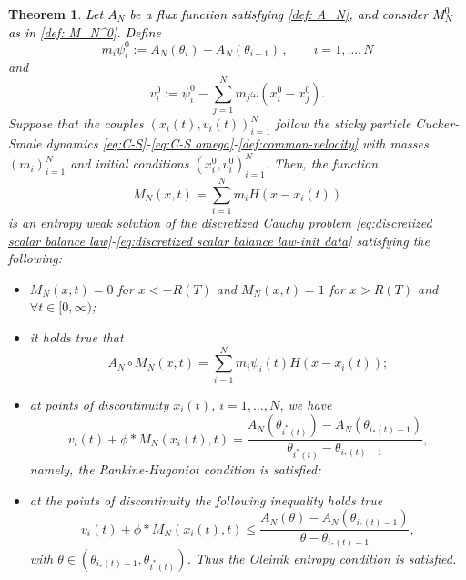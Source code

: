 \documentclass[11pt,a4paper,oneside]{amsart}
\newtheorem{theorem}[definition]{Theorem}
\begin{document}
\begin{theorem}\label{th:solution_MN}
\textcolor{black}{Let $A_N$ be a flux function satisfying \eqref{def: A_N}, and consider $M_N^0$ as in \eqref{def: M_N^0}. %
Define}
\begin{equation}\label{eq: psi_i^0}
    m_i\psi_i^0:=A_N(\theta_i)-A_N(\theta_{i-1})\,,\qquad i=1,\dots,N
\end{equation}
and
\begin{equation}
    v_i^0:=\psi_i^0-\sum_{j=1}^N m_j\omega(x_i^0-x_j^0).
\end{equation}
Suppose that the couples $(x_i(t),v_i(t))_{i=1}^N$ follow the sticky particle Cucker-Smale dynamics 
\eqref{eq:C-S}-\eqref{eq:C-S omega}-\eqref{def:common-velocity} with masses $(m_i)_{i=1}^N$ and initial conditions $(x_i^0,v_i^0)_{i=1}^N$. 
Then, the function
\begin{equation}\label{def: M_N solution}
    M_N(x,t)=\sum_{i=1}^Nm_iH(x-x_i(t))
\end{equation}
is an entropy weak solution of the discretized Cauchy problem \eqref{eq:discretized scalar balance law}-\eqref{eq:discretized scalar balance law-init data} 
satisfying the following:
\begin{itemize}
    \item[\textbf{(a)}] $M_N(x,t)=0$ for $x<-R(T)$ and $M_N(x,t)=1$ for $x>R(T)$ and $\forall t\in [0,\infty)$;
    \item[\textbf{(b)}] it holds true that
\begin{equation}\label{eq: A_N(M_N)}
    A_N\circ M_N(x,t)=\sum_{i=1}^Nm_i\psi_i(t)H(x-x_i(t));
\end{equation}
\item[\textbf{(c)}] at points of discontinuity $x_i(t)$, $i=1,\dots,N$, we have %
\begin{equation}\label{eq:eq_discontinuity}
        v_i(t)+\phi\ast M_N(x_i(t),t)=\frac{A_N(\theta_{i^*(t)})-A_N(\theta_{i_*(t)-1})}{\theta_{i^*(t)}-\theta_{i_*(t)-1}},
    \end{equation}
namely, the Rankine-Hugoniot condition is satisfied;
 \item[\textbf{(d)}] at the points of discontinuity the following inequality holds true
\begin{equation}\label{eq:ineq_discontinuity}
        v_i(t)+\phi\ast M_N(x_i(t),t)\leq\frac{A_N(\theta)-A_N(\theta_{i_*(t)-1})}{\theta-\theta_{i_*(t)-1}},
    \end{equation}
with $\theta\in(\theta_{i_*(t)-1},\theta_{i^*(t)})$. Thus the Oleinik entropy condition is satisfied.
\end{itemize}
\end{theorem}
\end{document}
